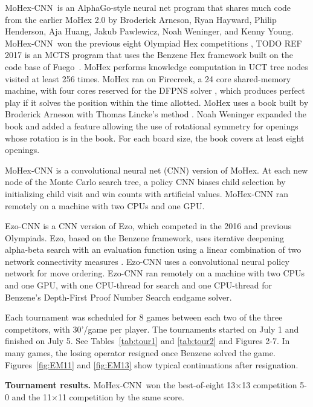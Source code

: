 \documentclass{IOS-Book-Article}
\def\Eo{\mbox{\sc Ezo}}
\def\Ec{\mbox{\sc Ezo-CNN}}
\def\Mx{\mbox{\sc MoHex}}
\def\Mc{\mbox{\sc MoHex-CNN}}
\def\Fuego{\mbox{\sc Fuego}}
\begin{document}
\Mc\ is an AlphaGo-style neural net program that shares
much code from the earlier MoHex 2.0 by 
Broderick Arneson, Ryan Hayward, Philip Henderson, Aja Huang, 
Jakub Pawlewicz, Noah Weninger, and Kenny Young.
\Mc\ won the previous
eight Olympiad Hex competitions \cite{HAHP13},
TODO REF 2017
is an MCTS program that uses the Benzene Hex framework
built on the code base of \Fuego\ \cite{fuego}.
\Mx{} performs knowledge computation 
in UCT tree nodes visited at least 256 times.
\Mx{} ran on Firecreek, a 24 core shared-memory machine, 
with four cores reserved for the 
DFPNS solver \cite{PawlH13}, which
produces perfect play if it solves the
position within the time allotted.
\Mx{} uses a book built by Broderick Arneson with Thomas Lincke's method 
\cite{DBLP:conf/cg/Lincke00}. 
Noah Weninger expanded the book and added a feature
allowing the use of rotational symmetry for openings
whose rotation is in the book.
For each board size, the book covers at least eight openings.

\Mc{} is a convolutional neural net (CNN) version of \Mx{}. 
At each new node of the Monte Carlo search tree, 
a policy CNN biases child selection by
initializing child visit and win counts with artificial values.
\Mc{} ran remotely on a machine with two CPUs and one GPU.

\Ec{} is a CNN version of \Eo{}, which competed
in the 2016 and previous Olympiads.
\Eo{}, based on the Benzene framework, 
uses iterative deepening alpha-beta search 
with an evaluation function using a linear combination of
two network connectivity measures \cite{TakadaHIY15}.
\Ec{} uses a convolutional neural policy network
for move ordering.
\Ec{} ran remotely on a machine
with two CPUs and one GPU,
with one CPU-thread for search and one CPU-thread for
Benzene's Depth-First Proof Number Search endgame solver.

Each tournament was scheduled for 8 games between
each two of the three competitors, with 30'/game per player.
The tournaments started on July 1 and finished on July 5.
See Tables~\ref{tab:tour1} and \ref{tab:tour2} and Figures 2-7.
In many games, the losing operator resigned once Benzene solved the game.
Figures~\ref{fig:EM11} and \ref{fig:EM13} show typical continuations
after resignation.

{\bf Tournament results.}
\Mc\ won the best-of-eight 13$\times$13 competition 5-0
and the 11$\times$11 competition by the same score.
\end{document}
